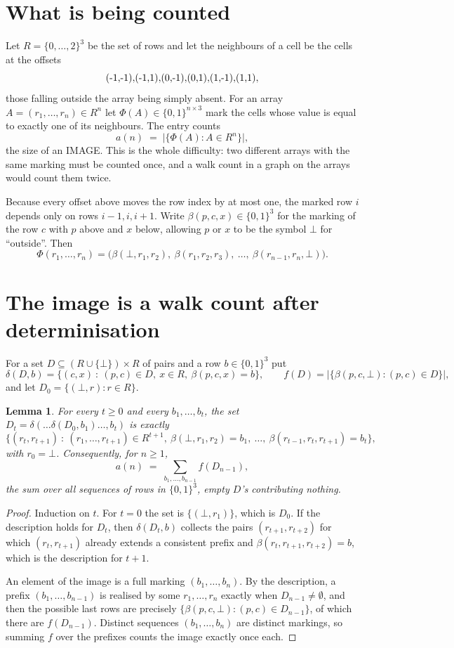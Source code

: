 \documentclass[11pt,a4paper]{article}
\theoremstyle{plain}
\newtheorem{lemma}[theorem]{Lemma}
\theoremstyle{definition}
\begin{document}
\section{What is being counted}

Let $R=\{0,\dots,2\}^{3}$ be the set of rows and let the neighbours of a cell be the
cells at the offsets
\[
$(-1,-1)$, $(-1,1)$, $(0,-1)$, $(0,1)$, $(1,-1)$, $(1,1)$,
\]
those falling outside the array being simply absent. For an array
$A=(r_1,\dots,r_n)\in R^n$ let $\Phi(A)\in\{0,1\}^{n\times3}$ mark the cells whose value
is equal to exactly one of its neighbours. The entry counts
\[
a(n)\;=\;\bigl|\{\Phi(A):A\in R^n\}\bigr| ,
\]
the size of an IMAGE. This is the whole difficulty: two different arrays with the same marking
must be counted once, and a walk count in a graph on the arrays would count them twice.

Because every offset above moves the row index by at most one, the marked row $i$ depends only
on rows $i-1,i,i+1$. Write $\beta(p,c,x)\in\{0,1\}^{3}$ for the marking of the row $c$
with $p$ above and $x$ below, allowing $p$ or $x$ to be the symbol $\bot$ for ``outside''.
Then
\[
\Phi(r_1,\dots,r_n)=\bigl(\beta(\bot,r_1,r_2),\ \beta(r_1,r_2,r_3),\ \dots,\
\beta(r_{n-1},r_n,\bot)\bigr).
\]

\section{The image is a walk count after determinisation}

For a set $D\subseteq(R\cup\{\bot\})\times R$ of pairs and a row $b\in\{0,1\}^{3}$ put
\[
\delta(D,b)=\{(c,x)\ :\ (p,c)\in D,\ x\in R,\ \beta(p,c,x)=b\},\qquad
f(D)=\bigl|\{\beta(p,c,\bot):(p,c)\in D\}\bigr| ,
\]
and let $D_0=\{(\bot,r):r\in R\}$.

\begin{lemma}\label{lem:det}
For every $t\ge0$ and every $b_1,\dots,b_t$, the set
$D_t=\delta(\dots\delta(D_0,b_1)\dots,b_t)$ is exactly
\[
\{(r_t,r_{t+1})\ :\ (r_1,\dots,r_{t+1})\in R^{t+1},\ \beta(\bot,r_1,r_2)=b_1,\ \dots,\
\beta(r_{t-1},r_t,r_{t+1})=b_t\} ,
\]
with $r_0=\bot$. Consequently, for $n\ge1$,
\[
a(n)\;=\;\sum_{b_1,\dots,b_{n-1}}f(D_{n-1}),
\]
the sum over all sequences of rows in $\{0,1\}^{3}$, empty $D$'s contributing nothing.
\end{lemma}

\begin{proof}
Induction on $t$. For $t=0$ the set is $\{(\bot,r_1)\}$, which is $D_0$. If the description
holds for $D_t$, then $\delta(D_t,b)$ collects the pairs $(r_{t+1},r_{t+2})$ for which
$(r_t,r_{t+1})$ already extends a consistent prefix and
$\beta(r_t,r_{t+1},r_{t+2})=b$, which is the description for $t+1$.

An element of the image is a full marking $(b_1,\dots,b_n)$. By the description, a prefix
$(b_1,\dots,b_{n-1})$ is realised by some $r_1,\dots,r_n$ exactly when $D_{n-1}\neq
\emptyset$, and then the possible last rows are precisely
$\{\beta(p,c,\bot):(p,c)\in D_{n-1}\}$, of which there are $f(D_{n-1})$. Distinct
sequences $(b_1,\dots,b_n)$ are distinct markings, so summing $f$ over the prefixes counts the
image exactly once each.
\end{proof}
\end{document}
